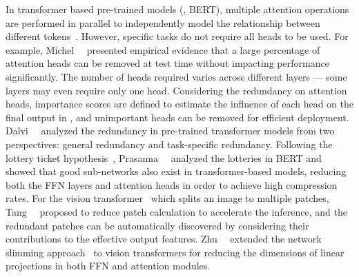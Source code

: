 In transformer based pre-trained models (\eg, BERT), multiple  attention operations are performed in parallel to independently model the relationship between  different tokens~. However, specific tasks do not require all heads to be used.  For example, Michel~\etal~  presented empirical evidence that a large percentage of attention heads can be removed at test time without  impacting performance significantly. The  number of heads required varies across different layers — some layers may even require only one head.  Considering the redundancy on attention heads, importance scores are defined to estimate the influence of each head on the final output in , and unimportant heads can be removed for efficient deployment. Dalvi~\etal~  analyzed the redundancy in pre-trained transformer models from two perspectives: general redundancy and task-specific redundancy. Following the lottery ticket hypothesis~, Prasanna~\etal~ analyzed the lotteries in BERT and showed that good sub-networks also exist in transformer-based models, reducing both the FFN layers and attention heads in order to achieve high compression rates. For the vision transformer~ which splits an image to multiple patches, Tang~\etal~ proposed to reduce patch calculation to accelerate the inference, and the redundant patches can be automatically discovered by considering their contributions to the effective output features. Zhu~\etal~ extended the network slimming approach~ to vision transformers for reducing the dimensions of linear projections in both FFN and attention modules.  
